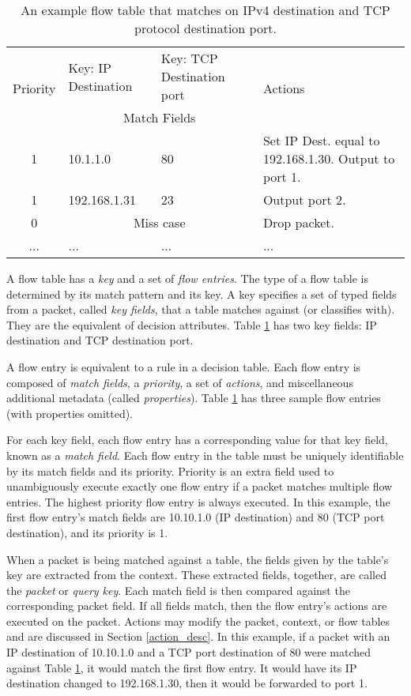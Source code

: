 \begin{table}[ht]
\caption{An example flow table that matches on IPv4 destination and TCP protocol
destination port.}
\label{tbl:flow_table}
\centering
\begin{tabularx}{\linewidth}{| c | X | X | X |}
\hline
\multirow{2}{*}{Priority} & Key: IP Destination & Key: TCP Destination port  &
\multirow{2}{*}{Actions} \\
\cline{2-3}
  & \multicolumn{2}{|c|}{Match Fields} & \\
\hline
\hline
1 & 10.1.1.0 & 80 & Set IP Dest. equal to 192.168.1.30. Output to port 1. \\
\hline
1 & 192.168.1.31 & 23 & Output port 2. \\
\hline
0 & \multicolumn{2}{|c|}{Miss case} & Drop packet. \\
\hline
... & ... & ... & ... \\
\hline
\end{tabularx}
\end{table}


A flow table has a \emph{key} and a set of \emph{flow entries}. The type of a flow table is determined by its match pattern and its key. A
key specifies a set of typed fields from a packet, called \emph{key fields}, that a table matches
against (or classifies with). They are the equivalent of decision attributes.
Table \ref{tbl:flow_table} has two key fields: IP destination and TCP
destination port.

A flow entry is equivalent to a rule in a decision table. Each flow entry is
composed of \emph{match fields}, a \emph{priority}, a set of
\emph{actions}, and miscellaneous additional metadata (called
\emph{properties}). Table \ref{tbl:flow_table} has three sample flow entries
(with properties omitted).

For each key field, each flow entry has a corresponding value for that
key field, known as a
\emph{match field}. Each flow entry in the table must be uniquely
identifiable by its match fields and its priority.
Priority is an extra field used to
unambiguously execute exactly one flow entry if a packet matches
multiple flow entries.
The highest priority flow entry is always executed.
In this example, the first flow entry's match fields are
10.10.1.0 (IP destination) and 80 (TCP port destination), and its priority is 1.

When a packet is being matched
against a table, the fields given by the table's key are extracted from the
context. These extracted fields, together, are called the \emph{packet} or \emph{query key}.
Each match field is then compared against the corresponding packet field.
If all fields match, then the flow entry's actions are executed on the packet.
Actions may modify the packet, context, or flow tables and are discussed in Section
\ref{action_desc}.
In this example, if a packet with an IP destination of 10.10.1.0 and a TCP port
destination of 80 were matched against Table \ref{tbl:flow_table}, it would
match the first flow entry. It would have its IP destination changed to
192.168.1.30, then it would be forwarded to port 1.

